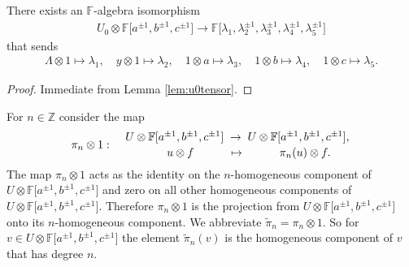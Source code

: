 \begin{Corollary}
\label{cor:polyalg}
There exists an $\mathbb F$-algebra isomorphism
\begin{gather*}
U_0 \otimes
\mathbb F \big\lbrack a^{\pm 1}, b^{\pm 1}, c^{\pm 1}\big\rbrack  \to
\mathbb F\big\lbrack \lambda_1,
\lambda_2^{\pm 1},
\lambda_3^{\pm 1},
\lambda_4^{\pm 1},
\lambda_5^{\pm 1} \big\rbrack
\end{gather*}
that sends
\begin{gather*}
\Lambda \otimes 1 \mapsto \lambda_1, \quad
y\otimes 1 \mapsto \lambda_2 ,\quad
1\otimes a \mapsto \lambda_3,
\quad
1\otimes b \mapsto \lambda_4,
\quad
1\otimes c \mapsto \lambda_5.
\end{gather*}
\end{Corollary}
\begin{proof}
Immediate from
Lemma
\ref{lem:u0tensor}.
\end{proof}

\begin{Definition}
\label{def:tildeproj}
\rm For $n \in \mathbb Z$  consider the
map
\begin{gather*}
\pi_n \otimes 1: \quad
\genfrac{}{}{0pt}{}{
U \otimes
\mathbb F \lbrack a^{\pm 1}, b^{\pm 1}, c^{\pm 1}\rbrack \; \to\;
U\otimes
\mathbb F \lbrack a^{\pm 1}, b^{\pm 1}, c^{\pm 1}\rbrack,
}
{\qquad  u \otimes f  \quad \qquad
\mapsto
\qquad \quad
\pi_n(u)\otimes f.}
\end{gather*}
The map
$\pi_n \otimes 1$
acts as the identity on the $n$-homogeneous component of
$U\otimes
\mathbb F \lbrack a^{\pm 1}, b^{\pm 1}, c^{\pm 1}\rbrack$
and  zero on all  other homogeneous components of
$U \otimes
\mathbb F \lbrack a^{\pm 1}, b^{\pm 1}, c^{\pm 1}\rbrack$.
Therefore
$\pi_n \otimes 1$ is the
projection from
$U\otimes
\mathbb F \lbrack a^{\pm 1}, b^{\pm 1}, c^{\pm 1}\rbrack$
onto its $n$-homogeneous component.
We abbreviate
$\tilde \pi_n =
\pi_n \otimes 1$.
So for $v \in
U \otimes
\mathbb F \lbrack a^{\pm 1}, b^{\pm 1}, c^{\pm 1}\rbrack$
the element
$\tilde \pi_n(v)$ is the homogeneous component of
$v$ that has degree $n$.
\end{Definition}

